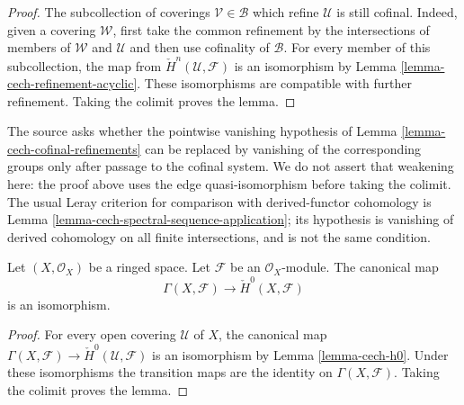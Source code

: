 \begin{proof}
The subcollection of coverings $\mathcal{V} \in \mathcal{B}$ which refine
$\mathcal{U}$ is still cofinal. Indeed, given a covering $\mathcal{W}$,
first take the common refinement by the intersections of members of
$\mathcal{W}$ and $\mathcal{U}$ and then use cofinality of $\mathcal{B}$.
For every member of this subcollection, the map from
$\check{H}^n(\mathcal{U}, \mathcal{F})$ is an isomorphism by
Lemma \ref{lemma-cech-refinement-acyclic}. These isomorphisms are compatible
with further refinement. Taking the colimit proves the lemma.
\end{proof}

\begin{remark}
\label{remark-FAC-cech-cofinal-question}
\begin{reference}
\cite[Chapter I, \S 4, no. 29, Remarks 1 and 2, p. 222]{FAC}
\end{reference}
The source asks whether the pointwise vanishing hypothesis of
Lemma \ref{lemma-cech-cofinal-refinements} can be replaced by vanishing of
the corresponding groups only after passage to the cofinal system. We do
not assert that weakening here: the proof above uses the edge
quasi-isomorphism before taking the colimit. The usual Leray criterion for
comparison with derived-functor cohomology is
Lemma \ref{lemma-cech-spectral-sequence-application}; its hypothesis is
vanishing of derived cohomology on all finite intersections, and is not the
same condition.
\end{remark}

\begin{lemma}
\label{lemma-cech-h0-space}
\begin{reference}
\cite[Chapter I, \S 3, no. 22, Proposition 4, p. 215]{FAC}
\end{reference}
Let $(X, \mathcal{O}_X)$ be a ringed space. Let $\mathcal{F}$ be an
$\mathcal{O}_X$-module. The canonical map
$$
\Gamma(X, \mathcal{F}) \longrightarrow \check{H}^0(X, \mathcal{F})
$$
is an isomorphism.
\end{lemma}

\begin{proof}
For every open covering $\mathcal{U}$ of $X$, the canonical map
$\Gamma(X, \mathcal{F}) \to \check{H}^0(\mathcal{U}, \mathcal{F})$
is an isomorphism by Lemma \ref{lemma-cech-h0}. Under these isomorphisms
the transition maps are the identity on $\Gamma(X, \mathcal{F})$.
Taking the colimit proves the lemma.
\end{proof}

